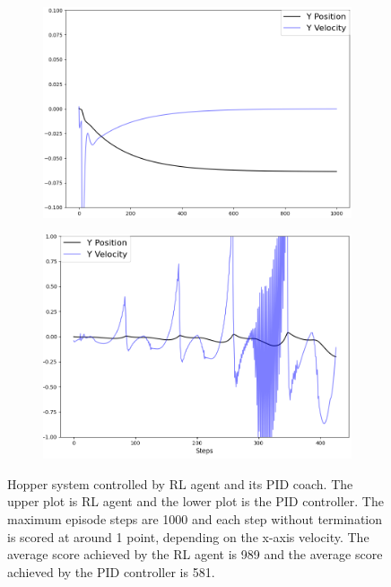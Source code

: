 \documentclass[journal]{IEEEtran}
\begin{document}
\begin{figure}
\centering
\begin{subfigure}{0.3\textwidth}
  \centering
  \includegraphics[width=\linewidth]{hopper_RL.png}
\end{subfigure}
\hfill
\begin{subfigure}{.3\textwidth}
  \centering
  \includegraphics[width=\linewidth]{hopper_PID.png}
\end{subfigure}
\caption{Hopper system controlled by RL agent and its PID coach. The upper plot is RL agent and the lower plot is the PID controller. The maximum episode steps are 1000 and each step without termination is scored at around 1 point, depending on the x-axis velocity. The average score achieved by the RL agent is 989 and the average score achieved by the PID controller is 581.}
\label{fig:hopper}
\end{figure}
\end{document}
